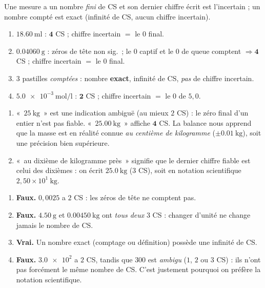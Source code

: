 \documentclass[11pt,a4paper]{article}
\begin{document}
\begin{corrige}
Une mesure a un nombre \emph{fini} de CS et son dernier chiffre écrit est l'incertain ; un nombre
compté est exact (infinité de CS, aucun chiffre incertain).
\begin{enumerate}[label=\alph*)]
  \item $\qty{18,60}{\milli\litre}$ : $\mathbf{4}$ CS ; chiffre incertain $=$ le $0$ final.
  \item $\qty{0,04060}{\gram}$ : zéros de tête non sig.\ ; le $0$ captif et le $0$ de queue comptent
        $\Rightarrow \mathbf{4}$ CS ; chiffre incertain $=$ le $0$ final.
  \item $3$ pastilles \emph{comptées} : nombre \textbf{exact}, infinité de CS, \emph{pas} de chiffre
        incertain.
  \item $\num{5,0e-3}\ \si{\mol\per\litre}$ : $\mathbf{2}$ CS ; chiffre incertain $=$ le $0$ de $5,0$.
\end{enumerate}
\end{corrige}

\begin{corrige}
\begin{enumerate}[label=\alph*)]
  \item «~$\qty{25}{\kilo\gram}$~» est une indication ambiguë (au mieux $2$ CS) : le zéro final d'un
        entier n'est pas fiable. «~$\qty{25,00}{\kilo\gram}$~» affiche $\mathbf{4}$ CS. La balance nous
        apprend que la masse est en réalité connue \emph{au centième de kilogramme} ($\pm\qty{0,01}{\kilo\gram}$),
        soit une précision bien supérieure.
  \item «~au dixième de kilogramme près~» signifie que le dernier chiffre fiable est celui des dixièmes :
        on écrit $\qty{25,0}{\kilo\gram}$ ($3$ CS), soit en notation scientifique
        $\boxed{2,50\times10^{1}\ \si{\kilo\gram}}$.
\end{enumerate}
\end{corrige}

\begin{corrige}
\begin{enumerate}[label=\alph*)]
  \item \textbf{Faux.} $0,0025$ a $2$ CS : les zéros de tête ne comptent pas.
  \item \textbf{Faux.} $\qty{4,50}{\gram}$ et $\qty{0,00450}{\kilo\gram}$ ont \emph{tous deux} $3$ CS :
        changer d'unité ne change jamais le nombre de CS.
  \item \textbf{Vrai.} Un nombre exact (comptage ou définition) possède une infinité de CS.
  \item \textbf{Faux.} $\num{3,0e2}$ a $2$ CS, tandis que $300$ est \emph{ambigu} ($1$, $2$ ou $3$ CS) :
        ils n'ont pas forcément le même nombre de CS. C'est justement pourquoi on préfère la notation
        scientifique.
\end{enumerate}
\end{corrige}
\end{document}
